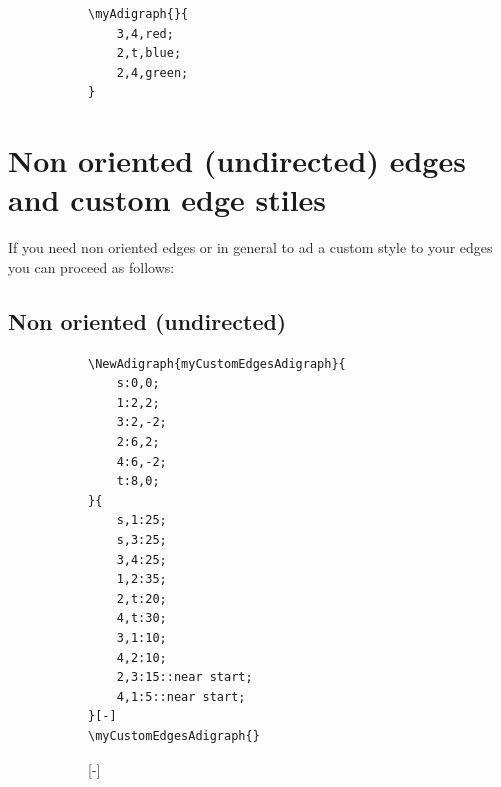 \documentclass{report}
\begin{document}
\begin{figure}
	\begin{subfigure}{0.49\textwidth}
		\begin{verbatim}
\myAdigraph{}{
	3,4,red;
	2,t,blue;
	2,4,green;
}
\end{verbatim}
	\end{subfigure}
	\begin{subfigure}{0.49\textwidth}
	\end{subfigure}
\end{figure}

\section{Non oriented (undirected) edges and custom edge stiles}
If you need non oriented edges or in general to ad a custom style to your edges you can proceed as follows:
\subsection{Non oriented (undirected)}
\begin{figure}
	\begin{subfigure}{0.49\textwidth}
		\begin{verbatim}
\NewAdigraph{myCustomEdgesAdigraph}{
	s:0,0;
	1:2,2;
	3:2,-2;
	2:6,2;
	4:6,-2;
	t:8,0;
}{
	s,1:25;
	s,3:25;
	3,4:25;
	1,2:35;
	2,t:20;
	4,t:30;
	3,1:10;
	4,2:10;
	2,3:15::near start;
	4,1:5::near start;
}[-]
\myCustomEdgesAdigraph{}
\end{verbatim}
	\end{subfigure}
	\begin{subfigure}{0.49\textwidth}
		[-]
		\myCustomEdgesAdigraph{}
	\end{subfigure}
\end{figure}
\end{document}
